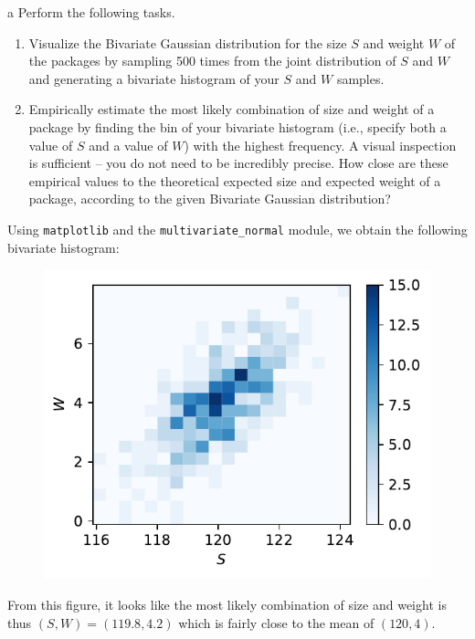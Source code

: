\documentclass[expanded]{pset}
\begin{document}
\begin{parts}
  \begin{part}{a}
    Perform the following tasks.

    \begin{enumerate}
        \item Visualize the Bivariate Gaussian distribution for the size $S$ and weight $W$ of the packages by sampling 500 times from the joint distribution of $S$ and $W$ and generating a bivariate histogram of your $S$ and $W$ samples.
        \item Empirically estimate the most likely combination of size and weight of a package by finding the bin of your bivariate histogram (i.e., specify both a value of $S$ and a value of $W$) with the highest frequency. A visual inspection is sufficient -- you do not need to be incredibly precise.  How close are these empirical values to the theoretical expected size and expected weight of a package, according to the given Bivariate Gaussian distribution?
    \end{enumerate}
  \end{part}

  Using \texttt{matplotlib} and the \texttt{multivariate\_normal} module, we obtain the following bivariate histogram:

  \begin{figure}[ht]
    \centering
    \includegraphics[]{3a.pdf}
  \end{figure}\noindent
  From this figure, it looks like the most likely combination of size and weight is thus $(S,W)=(119.8, 4.2)$ which is fairly close to the mean of $(120, 4)$.


\end{parts}
\end{document}
